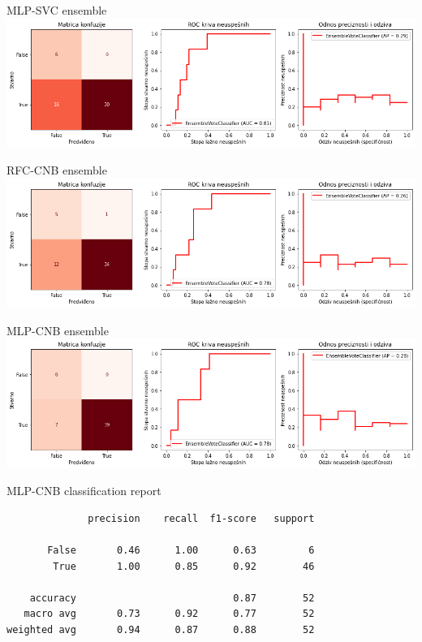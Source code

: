 \documentclass[hyperref={bookmarks=false}]{beamer}
\begin{document}
\begin{frame}{MLP-SVC ensemble}
\includegraphics[width=\textwidth]{../slike/mlpsvc.png}
\end{frame}

\begin{frame}{RFC-CNB ensemble}
\includegraphics[width=\textwidth]{../slike/forcnb.png}
\end{frame}

\begin{frame}{MLP-CNB ensemble}
\includegraphics[width=\textwidth]{../slike/mlpcnb.png}
\end{frame}

\begin{frame}[fragile]{MLP-CNB classification report}
\begin{lstlisting}
              precision    recall  f1-score   support

       False       0.46      1.00      0.63         6
        True       1.00      0.85      0.92        46

    accuracy                           0.87        52
   macro avg       0.73      0.92      0.77        52
weighted avg       0.94      0.87      0.88        52
\end{lstlisting}
\end{frame}
\end{document}
